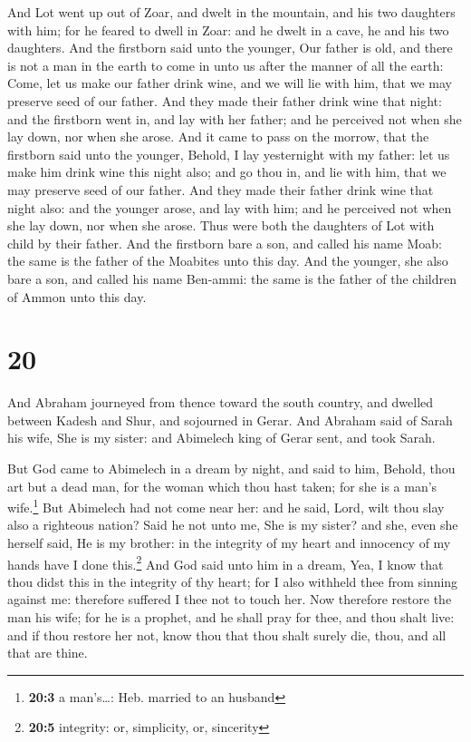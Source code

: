  And Lot went up out of Zoar, and dwelt in the mountain,
and his two daughters with him; for he feared to dwell in Zoar: and he
dwelt in a cave, he and his two daughters.  And the
firstborn said unto the younger, Our father is old, and there is not a
man in the earth to come in unto us after the manner of all the earth:
 Come, let us make our father drink wine, and we will lie
with him, that we may preserve seed of our father.  And
they made their father drink wine that night: and the firstborn went in,
and lay with her father; and he perceived not when she lay down, nor
when she arose.  And it came to pass on the morrow, that
the firstborn said unto the younger, Behold, I lay yesternight with my
father: let us make him drink wine this night also; and go thou in, and
lie with him, that we may preserve seed of our father. 
And they made their father drink wine that night also: and the younger
arose, and lay with him; and he perceived not when she lay down, nor
when she arose.  Thus were both the daughters of Lot with
child by their father.  And the firstborn bare a son, and
called his name Moab: the same is the father of the Moabites unto this
day.  And the younger, she also bare a son, and called
his name Ben-ammi: the same is the father of the children of Ammon unto
this day.

\hypertarget{section-19}{%
\section{20}\label{section-19}}

 And Abraham journeyed from thence toward the south
country, and dwelled between Kadesh and Shur, and sojourned in Gerar.
 And Abraham said of Sarah his wife, She is my sister: and
Abimelech king of Gerar sent, and took Sarah.

 But God came to Abimelech in a dream by night, and said
to him, Behold, thou art but a dead man, for the woman which thou hast
taken; for she is a man's wife.\footnote{\textbf{20:3} a man's\ldots:
  Heb. married to an husband}  But Abimelech had not come
near her: and he said, Lord, wilt thou slay also a righteous nation?
 Said he not unto me, She is my sister? and she, even she
herself said, He is my brother: in the integrity of my heart and
innocency of my hands have I done this.\footnote{\textbf{20:5}
  integrity: or, simplicity, or, sincerity}  And God said
unto him in a dream, Yea, I know that thou didst this in the integrity
of thy heart; for I also withheld thee from sinning against me:
therefore suffered I thee not to touch her.  Now therefore
restore the man his wife; for he is a prophet, and he shall pray for
thee, and thou shalt live: and if thou restore her not, know thou that
thou shalt surely die, thou, and all that are thine.


